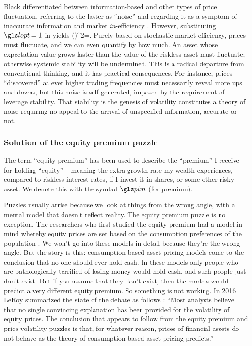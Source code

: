 Black differentiated between information-based and other types of price fluctuation, referring to the latter as ``noise'' and regarding it as a symptom of inaccurate information and market {\it in}-efficiency \cite{Black1986}. However, substituting $\lopt=1$ in  yields 
\be
{}
\left(\sigmas\right)^2=\mue.
\ee
Purely based on stochastic market efficiency, prices must fluctuate, and we can even quantify by how much. An asset whose expectation value grows faster than the value of the riskless asset must fluctuate; otherwise systemic stability will be undermined.
This is a radical departure from conventional thinking, and it has practical consequences. For instance, prices ``discovered'' at ever higher trading frequencies must necessarily reveal more ups and downs, but this noise is self-generated, imposed by the requirement of leverage stability. That stability is the genesis of volatility constitutes a theory of noise requiring no appeal to the arrival of unspecified information, accurate or not.

\subsubsection{Solution of the equity premium puzzle}
The term ``equity premium'' has been used to describe the ``premium'' I receive for holding ``equity'' -- meaning the extra growth rate my wealth experiences, compared to riskless interest rates, if I invest it in shares, or some other risky asset. We denote this with the symbol $\pim$ (for premium). 

Puzzles usually arrise because we look at things from the wrong angle, with a mental model that doesn't reflect reality. The equity premium puzzle is no exception. The researchers who first studied the equity premium had a model in mind whereby equity prices are set based on the consumption preferences of the population \cite{MehraPrescott1985}. 
We won't go into these models in detail because they're the wrong angle. But the story is this: consumption-based asset pricing models come to the conclusion that no one should ever hold cash. In these models only people who are pathologically terrified of losing money would hold cash, and such people just don't exist. But if you assume that they don't exist, then the models would predict a very different equity premium. So something is not working.
In 2016 LeRoy summarized the state of the debate as follows \cite{LeRoy2016}: ``Most analysts believe that no single convincing explanation has been provided for the volatility of equity prices. The conclusion that appears to follow from the equity premium and price volatility puzzles is that, for whatever reason, prices of financial assets do not behave as the theory of consumption-based asset pricing predicts.''

